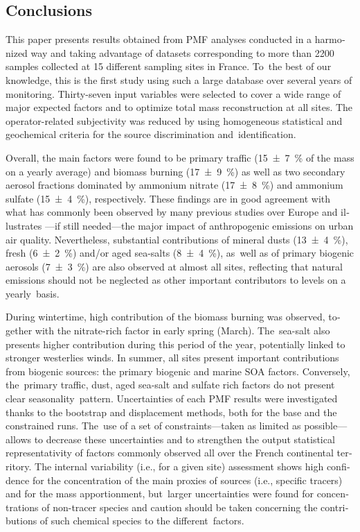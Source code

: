 \begin{otherlanguage}{english}
\section{Conclusions}%
\label{sec:conclusion}

This paper presents results obtained from PMF analyses conducted in a harmonized way and
taking advantage of datasets corresponding to more than \num{2200} samples collected at 15
different sampling sites in France. To~the best of our knowledge, this is the first study
using such a large database over several years of monitoring. Thirty-seven input variables
were selected to cover a wide range of major expected \PM{} factors and to optimize total
mass reconstruction at all sites.  The operator-related subjectivity was reduced by using
homogeneous statistical and geochemical criteria for the source discrimination
and~identification. 

Overall, the main \PM{} factors were found to be primary traffic (\SI{15\pm7}{\percent} of
the \PM{} mass on a yearly average) and biomass burning (\SI{17\pm9}{\percent}) as well as
two secondary aerosol fractions dominated by ammonium nitrate (\SI{17\pm8}{\percent}) and
ammonium sulfate (\SI{15\pm4}{\percent}), respectively. These findings are in good
agreement with what has   commonly been observed by many previous studies over Europe and
illustrates ---if still needed---the major impact of anthropogenic emissions on urban air
quality. Nevertheless, substantial contributions of mineral dusts (\SI{13\pm4}{\percent}),
fresh (\SI{6\pm2}{\percent}) and/or aged sea-salts (\SI{8\pm4}{\percent}), as~well as of
primary biogenic aerosols (\SI{7\pm3}{\percent}) are also observed at almost all sites,
reflecting that natural emissions should not be neglected as other important contributors
to \PM{} levels on a yearly~basis.

During wintertime, high contribution of the biomass burning  was observed, together with
the nitrate-rich factor in early spring (March). The~sea-salt also presents higher
contribution during this period of the year, potentially linked to stronger westerlies
winds.  In summer, all sites present important contributions from biogenic sources: the
primary biogenic and marine SOA factors.  Conversely, the~primary traffic, dust, aged
sea-salt and sulfate rich factors do not present clear seasonality~pattern.  Uncertainties
of each PMF results were investigated thanks to the bootstrap and displacement methods,
both for the base and the constrained runs. The~use of a set of constraints---taken as
limited as possible---allows to decrease these uncertainties and to strengthen the output
statistical representativity of factors commonly observed all over the French continental
territory.  The internal variability (i.e., for a given site) assessment shows high
confidence for the concentration of the main proxies of sources (i.e., specific tracers)
and for the \PM{} mass apportionment, but~larger uncertainties were  found for
concentrations of non-tracer species and caution should be taken concerning the
contributions of such chemical species to the different~factors.


\end{otherlanguage}
